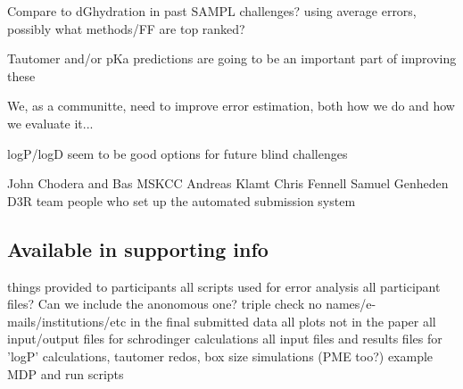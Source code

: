 Compare to dGhydration in past SAMPL challenges? using average errors, possibly what methods/FF are top ranked?

Tautomer and/or pKa predictions are going to be an important part of improving these

We, as a communitte, need to improve error estimation, both how we do and how we evaluate it...

logP/logD seem to be good options for future blind challenges

\begin{acknowledgements} %
John Chodera and Bas MSKCC
Andreas Klamt
Chris Fennell
Samuel Genheden
D3R team
people who set up the automated submission system %


\end{acknowledgements}

\subsection{Available in supporting info} %
things provided to participants
all scripts used for error analysis
all participant files? Can we include the anonomous one? 
triple check no names/e-mails/institutions/etc in the final submitted data
all plots not in the paper
all input/output files for schrodinger calculations
all input files and results files for 'logP' calculations, tautomer redos, box size simulations (PME too?) 
example MDP and run scripts
 




